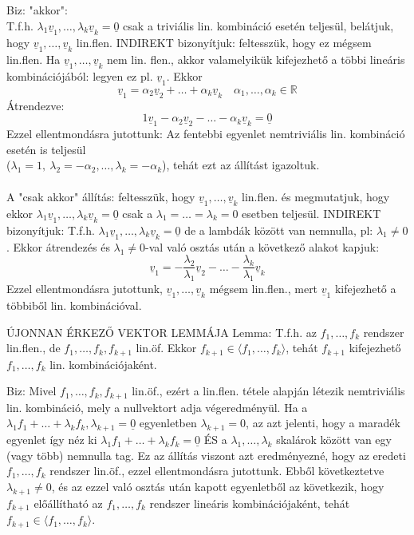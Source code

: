 \documentclass[]{article}
\newcommand{\R}{\mathbb{R}}
\newcommand{\Und}[1]{\underline{#1}}
\begin{document}
\begin{leftbar}
Biz: "akkor":\\
T.f.h. $\lambda_1\Und{v}_1,\ldots,\lambda_k\Und{v}_k = \Und{0}$ csak a triviális lin. kombináció esetén teljesül, belátjuk, hogy $\Und{v}_1,\ldots,\Und{v}_k$ lin.flen. INDIREKT bizonyítjuk: feltesszük, hogy ez mégsem lin.flen. Ha $\Und{v}_1,\ldots,\Und{v}_k$ nem lin. flen., akkor valamelyikük kifejezhető a többi lineáris kombinációjából: legyen ez pl. $\Und{v}_1$. Ekkor $$\Und{v}_1 = \alpha_2\Und{v}_2 + \ldots + \alpha_k\Und{v}_k\quad \alpha_1,\ldots,\alpha_k \in \R$$
Átrendezve: $$1\Und{v}_1-\alpha_2\Und{v}_2 - \ldots - \alpha_k\Und{v}_k = \Und{0}$$
Ezzel ellentmondásra jutottunk: Az fentebbi egyenlet nemtriviális lin. kombináció esetén is teljesül \\($\lambda_1 = 1,\: \lambda_2 = -\alpha_2,\ldots, \lambda_k = -\alpha_k$), tehát ezt az állítást igazoltuk.\\\\
A "csak akkor" állítás: feltesszük, hogy  $\Und{v}_1,\ldots,\Und{v}_k$ lin.flen. és megmutatjuk, hogy ekkor  $\lambda_1\Und{v}_1,\ldots,\lambda_k\Und{v}_k = \Und{0}$ csak a $\lambda_1 = \ldots = \lambda_k = 0$ esetben teljesül. INDIREKT bizonyítjuk: T.f.h. $\lambda_1\Und{v}_1,\ldots,\lambda_k\Und{v}_k = \Und{0}$ de a lambdák között van nemnulla, pl: $\lambda_1 \neq 0$. Ekkor átrendezés és $\lambda_1 \neq 0$-val való osztás után a következő alakot kapjuk:
$$\Und{v}_1 = -\frac{\lambda_2}{\lambda_1}\Und{v}_2-\ldots-\frac{\lambda_k}{\lambda_1}\Und{v}_k$$
Ezzel ellentmondásra jutottunk, $\Und{v}_1,\ldots,\Und{v}_k$ mégsem lin.flen., mert $\Und{v}_1$ kifejezhető a többiből lin. kombinációval.
\end{leftbar}
\begin{framed}
ÚJONNAN ÉRKEZŐ VEKTOR LEMMÁJA Lemma: T.f.h. az $f_1,\ldots,f_k$ rendszer lin.flen., de $f_1,\ldots,f_k,f_{k+1}$ lin.öf. Ekkor $f_{k+1} \in \langle f_1,\ldots,f_k \rangle$, tehát $f_{k+1}$ kifejezhető $f_1,\ldots,f_k$ lin. kombinációjaként.
\end{framed}
\begin{leftbar}
Biz: Mivel $f_1,\ldots,f_k,f_{k+1}$ lin.öf., ezért a lin.flen. tétele alapján létezik nemtriviális lin. kombináció, mely a nullvektort adja végeredményül. Ha a
$\lambda_1f_1+\ldots+\lambda_kf_k,\lambda_{k+1} = \Und{0}$  egyenletben $\lambda_{k+1} = 0$, az azt jelenti, hogy a maradék egyenlet így néz ki $\lambda_1f_1+\ldots+\lambda_kf_k = \Und{0}$ ÉS a $\lambda_1,\ldots,\lambda_k$ skalárok között van egy (vagy több) nemnulla tag. Ez az állítás viszont azt eredményezné, hogy az eredeti $f_1,\ldots,f_k$ rendszer lin.öf., ezzel ellentmondásra jutottunk. Ebből következtetve $\lambda_{k+1} \neq 0$, és az ezzel való osztás után kapott egyenletből az következik, hogy $f_{k+1}$ előállítható az $f_1,\ldots,f_k$ rendszer lineáris kombinációjaként, tehát $f_{k+1} \in \langle f_1,\ldots,f_k \rangle$.
\end{leftbar}
\end{document}

